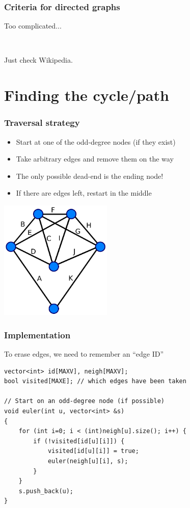 \documentclass[12pt]{beamer}
\begin{document}
\begin{frame}
\frametitle{Criteria for directed graphs}
Too complicated...

~

Just check Wikipedia.
\end{frame}

\section{Finding the cycle/path}

\begin{frame}
\frametitle{Traversal strategy}
\begin{itemize}
\item Start at one of the odd-degree nodes (if they exist)
\item Take arbitrary edges and remove them on the way
\item The only possible dead-end is the ending node!
\item If there are edges left, restart in the middle
\end{itemize}
\begin{center}
\includegraphics[width=0.4\textwidth]{img/euler-graph}
\end{center}
\end{frame}

\begin{frame}[fragile]
\frametitle{Implementation}
To erase edges, we need to remember an ``edge ID''
\begin{lstlisting}
vector<int> id[MAXV], neigh[MAXV];
bool visited[MAXE]; // which edges have been taken

// Start on an odd-degree node (if possible)
void euler(int u, vector<int> &s)
{
    for (int i=0; i < (int)neigh[u].size(); i++) {
        if (!visited[id[u][i]]) {
            visited[id[u][i]] = true;
            euler(neigh[u][i], s);
        }
    }
    s.push_back(u);
}
\end{lstlisting}
\end{frame}
\end{document}

